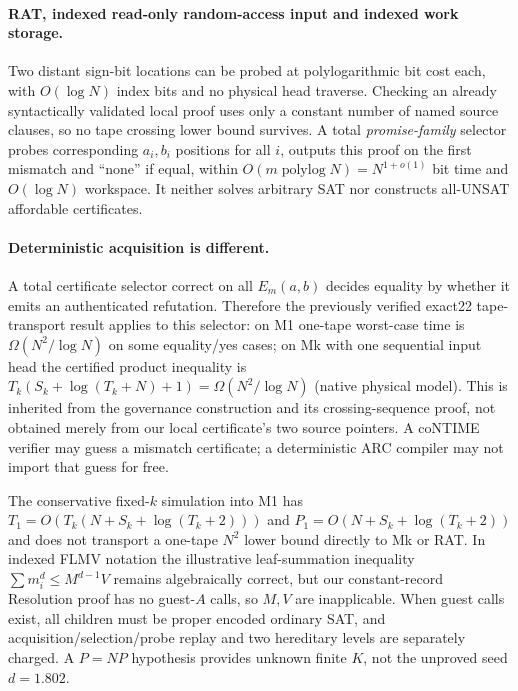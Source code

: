 \documentclass[11pt]{article}
\begin{document}
\paragraph{RAT, indexed read-only random-access input and indexed work storage.} Two distant sign-bit locations can be probed at polylogarithmic bit cost each, with $O(\log N)$ index bits and no physical head traverse. Checking an already syntactically validated local proof uses only a constant number of named source clauses, so no tape crossing lower bound survives. A total \emph{promise-family} selector probes corresponding $a_i,b_i$ positions for all $i$, outputs this proof on the first mismatch and ``none'' if equal, within $O(m\operatorname{polylog}N)=N^{1+o(1)}$ bit time and $O(\log N)$ workspace. It neither solves arbitrary SAT nor constructs all-UNSAT affordable certificates.

\paragraph{Deterministic acquisition is different.} A total certificate selector correct on all $E_m(a,b)$ decides equality by whether it emits an authenticated refutation. Therefore the previously verified exact22 tape-transport result applies to this selector: on M1 one-tape worst-case time is $\Omega(N^2/\log N)$ on some equality/yes cases; on Mk with one sequential input head the certified product inequality is $T_k(S_k+\log(T_k+N)+1)=\Omega(N^2/\log N)$ (native physical model). This is inherited from the governance construction and its crossing-sequence proof, not obtained merely from our local certificate's two source pointers. A coNTIME verifier may guess a mismatch certificate; a deterministic ARC compiler may not import that guess for free.

The conservative fixed-$k$ simulation into M1 has $T_1=O(T_k(N+S_k+\log(T_k+2)))$ and $P_1=O(N+S_k+\log(T_k+2))$ and does not transport a one-tape $N^2$ lower bound directly to Mk or RAT. In indexed FLMV notation the illustrative leaf-summation inequality $\sum m_i^d\le M^{d-1}V$ remains algebraically correct, but our constant-record Resolution proof has no guest-$A$ calls, so $M,V$ are inapplicable. When guest calls exist, all children must be proper encoded ordinary SAT, and acquisition/selection/probe replay and two hereditary levels are separately charged. A $P=NP$ hypothesis provides unknown finite $K$, not the unproved seed $d=1.802$.
\end{document}
